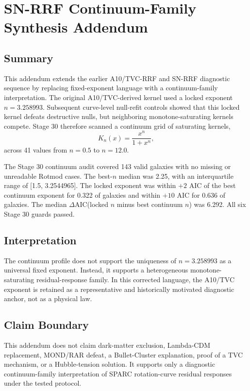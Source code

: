 \section*{SN-RRF Continuum-Family Synthesis Addendum}

\subsection*{Summary}

This addendum extends the earlier A10/TVC-RRF and SN-RRF diagnostic sequence by replacing fixed-exponent language with a continuum-family interpretation. The original A10/TVC-derived kernel used a locked exponent $n = 3.258993$. Subsequent curve-level null-refit controls showed that this locked kernel defeats destructive nulls, but neighboring monotone-saturating kernels compete. Stage 30 therefore scanned a continuum grid of saturating kernels,
\[
K_n(x) = \frac{x^n}{1+x^n},
\]
across 41 values from $n=0.5$ to $n=12.0$.

The Stage 30 continuum audit covered 143 valid galaxies with no missing or unreadable Rotmod cases. The best-$n$ median was 2.25, with an interquartile range of [1.5, 3.2544965]. The locked exponent was within $+2$ AIC of the best continuum exponent for 0.322 of galaxies and within $+10$ AIC for 0.636 of galaxies. The median $\Delta$AIC(locked $n$ minus best continuum $n$) was 6.292. All six Stage 30 guards passed.

\subsection*{Interpretation}

The continuum profile does not support the uniqueness of $n = 3.258993$ as a universal fixed exponent. Instead, it supports a heterogeneous monotone-saturating residual-response family. In this corrected language, the A10/TVC exponent is retained as a representative and historically motivated diagnostic anchor, not as a physical law.

\subsection*{Claim Boundary}

This addendum does not claim dark-matter exclusion, Lambda-CDM replacement, MOND/RAR defeat, a Bullet-Cluster explanation, proof of a TVC mechanism, or a Hubble-tension solution. It supports only a diagnostic continuum-family interpretation of SPARC rotation-curve residual responses under the tested protocol.
